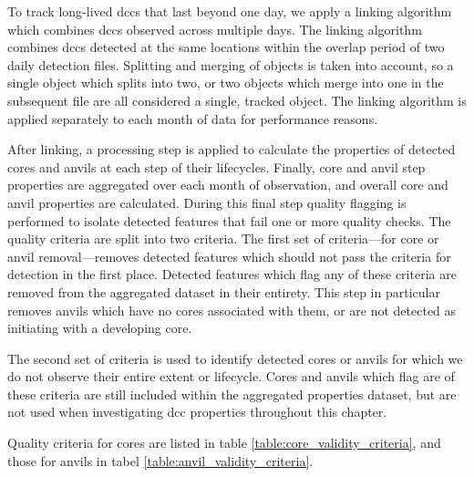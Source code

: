 To track long-lived \acrshort{dcc}s that last beyond one day, we apply a linking algorithm which combines \acrshort{dcc}s observed across multiple days.
The linking algorithm combines \acrshort{dcc}s detected at the same locations within the overlap period of two daily detection files.
Splitting and merging of objects is taken into account, so a single object which splits into two, or two objects which merge into one in the subsequent file are all considered a single, tracked object.
The linking algorithm is applied separately to each month of data for performance reasons.

After linking, a processing step is applied to calculate the properties of detected cores and anvils at each step of their lifecycles.
Finally, core and anvil step properties are aggregated over each month of observation, and overall core and anvil properties are calculated.
During this final step quality flagging is performed to isolate detected features that fail one or more quality checks.
The quality criteria are split into two criteria.
The first set of criteria---for core or anvil removal---removes detected features which should not pass the criteria for detection in the first place.
Detected features which flag any of these criteria are removed from the aggregated dataset in their entirety.
This step in particular removes anvils which have no cores associated with them, or are not detected as initiating with a developing core.

The second set of criteria is used to identify detected cores or anvils for which we do not observe their entire extent or lifecycle.
Cores and anvils which flag are of these criteria are still included within the aggregated properties dataset, but are not used when investigating \acrshort{dcc} properties throughout this chapter.

Quality criteria for cores are listed in table \ref{table:core_validity_criteria}, and those for anvils in tabel \ref{table:anvil_validity_criteria}.


